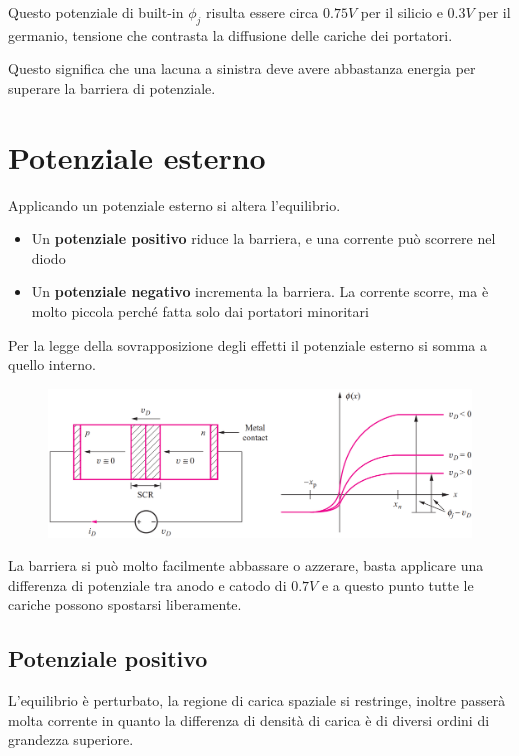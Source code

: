 Questo potenziale di built-in $\phi_j$ risulta essere circa $0.75V$ per il silicio e $0.3V$ per il germanio, tensione che contrasta la diffusione delle cariche dei portatori.

Questo significa che una lacuna a sinistra deve avere abbastanza energia per superare la barriera di potenziale.

\section{Potenziale esterno}

Applicando	un	potenziale	esterno	si	altera	l'equilibrio.

\begin{itemize}
    \item Un	\textbf{potenziale	positivo}	riduce	la	barriera,	e	una	corrente	può	scorrere	nel	diodo
    \item Un	\textbf{potenziale	negativo}	incrementa	la	barriera.	La	corrente	scorre,	ma	è	molto	piccola	perché	fatta	solo	dai	portatori	minoritari
\end{itemize}

Per la legge della sovrapposizione degli effetti il potenziale esterno si somma a quello interno.

\begin{figure}[htbp]
    \centering
    \includegraphics[width=0.9\linewidth]{img/pote_est.png}
    
    
\end{figure}

La barriera si può molto facilmente abbassare o azzerare, basta applicare una differenza di potenziale tra anodo e catodo di $0.7V$ e a questo punto tutte le cariche possono spostarsi liberamente.

\subsection{Potenziale	positivo}
L'equilibrio	è	perturbato,	la	regione	di	carica	spaziale	si	restringe, inoltre passerà molta corrente in quanto la differenza di densità di carica è di diversi ordini di grandezza superiore.

